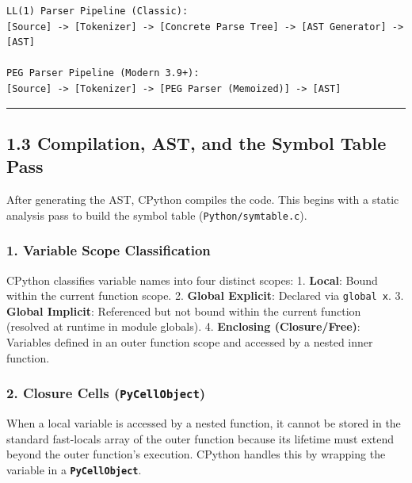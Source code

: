 \begin{lstlisting}
LL(1) Parser Pipeline (Classic):
[Source] -> [Tokenizer] -> [Concrete Parse Tree] -> [AST Generator] -> [AST]

PEG Parser Pipeline (Modern 3.9+):
[Source] -> [Tokenizer] -> [PEG Parser (Memoized)] -> [AST]
\end{lstlisting}

\begin{center}\rule{0.5\linewidth}{0.5pt}\end{center}

\hypertarget{compilation-ast-and-the-symbol-table-pass}{%
\subsection{1.3 Compilation, AST, and the Symbol Table
Pass}\label{compilation-ast-and-the-symbol-table-pass}}

After generating the AST, CPython compiles the code. This begins with a
static analysis pass to build the symbol table
(\passthrough{\lstinline!Python/symtable.c!}).

\hypertarget{variable-scope-classification}{%
\subsubsection{1. Variable Scope
Classification}\label{variable-scope-classification}}

CPython classifies variable names into four distinct scopes: 1.
\textbf{Local}: Bound within the current function scope. 2.
\textbf{Global Explicit}: Declared via
\passthrough{\lstinline!global x!}. 3. \textbf{Global Implicit}:
Referenced but not bound within the current function (resolved at
runtime in module globals). 4. \textbf{Enclosing (Closure/Free)}:
Variables defined in an outer function scope and accessed by a nested
inner function.

\hypertarget{closure-cells-pycellobject}{%
\subsubsection{\texorpdfstring{2. Closure Cells
(\texttt{PyCellObject})}{2. Closure Cells (PyCellObject)}}\label{closure-cells-pycellobject}}

When a local variable is accessed by a nested function, it cannot be
stored in the standard fast-locals array of the outer function because
its lifetime must extend beyond the outer function's execution. CPython
handles this by wrapping the variable in a
\textbf{\passthrough{\lstinline!PyCellObject!}}.


